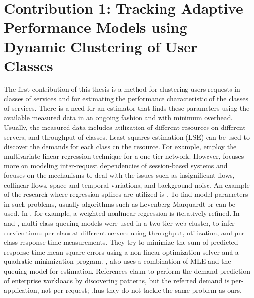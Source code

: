 \documentclass[11pt]{article}
\begin{document}
 \section{Contribution 1: Tracking Adaptive Performance Models using Dynamic Clustering of User Classes} 
\label{models_in_a_state_estimation} 
The first contribution of this thesis is a method for clustering users requests in classes of services and for estimating the performance characteristic of the classes of services.
		There is a need for an estimator that finds these parameters using the available measured data in an ongoing fashion and with minimum overhead. Usually, the measured data includes utilization of different resources on different servers, and throughput of classes.   
Least squares estimation (LSE) can be used to discover the demands for each class on the resource. For example, 
\cite{pacifici_cpu_2008,zhang_regression-based_2007} employ the multivariate linear regression technique for a one-tier network. However, \cite{zhang_regression-based_2007} focuses more on modeling inter-request dependencies of session-based systems and \cite{pacifici_cpu_2008} focuses on the mechanisms to deal with the issues such as insignificant flows, collinear flows, space and temporal variations, and background noise. 
 An example of the research where regression splines are utilized is \cite{courtois_using_2000}. To find model parameters in such problems, usually algorithms such as Levenberg-Marquardt \cite{wild_nonlinear_2003} or \cite{dumouchel1989integrating} can be used. In \cite{dumouchel1989integrating}, for example, a weighted nonlinear regression is iteratively refined. In \cite{zhang_workload_2002} and \cite{liu_parameter_2006}, multi-class queuing models were used in a two-tier web cluster, to infer service times per-class at different servers using throughput, utilization, and per-class response time measurements. They try to minimize the sum of predicted response time mean square errors using a non-linear optimization solver and a quadratic minimization program. \cite{kraft_estimating_2009}, also uses a combination of MLE and the queuing model for estimation.  
 References \cite{gmach_workload_2007,gmach_capacity_2007} claim to perform the demand prediction of enterprise workloads by discovering patterns, but the referred demand is per-application, not per-request; thus they do not tackle the same problem as ours. 
 
\end{document}
